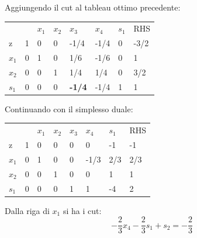 Aggiungendo il cut al tableau ottimo precedente:
\begin{table}[!h]
	\centering
	\begin{tabular}{llllllll}
				&                         & $x_{1}$ & $x_{2}$  & $x_{3}$ & $x_{4}$ & $s_{1}$ &  RHS  \\ \cline{2-8}
		z		& \multicolumn{1}{|l|}{1} & 0       & 0        & -1/4    & -1/4    & 0 & \multicolumn{1}{|l|}{-3/2} \\ \cline{2-8}
		$x_{1}$ & \multicolumn{1}{|l|}{0} & 1       & 0        & 1/6     & -1/6    & 0 & \multicolumn{1}{|l|}{1} \\
		$x_{2}$ & \multicolumn{1}{|l|}{0} & 0       & 1        & 1/4     & 1/4     & 0 & \multicolumn{1}{|l|}{3/2} \\
		$s_{1}$ & \multicolumn{1}{|l|}{0} & 0       & 0        & \textbf{-1/4}     & -1/4   & 1  & \multicolumn{1}{|l|}{1} \\ \cline{2-8}
	\end{tabular}
\end{table}

Continuando con il simplesso duale:
\begin{table}[!h]
	\centering
	\begin{tabular}{llllllll}
				&       				  & $x_{1}$ & $x_{2}$  & $x_{3}$ & $x_{4}$ & $s_{1}$ &  RHS  \\ \cline{2-8}
		z		& \multicolumn{1}{|l|}{1} & 0       & 0        & 0       & 0       & -1      & \multicolumn{1}{|l|}{-1} \\ \cline{2-8}
		$x_{1}$ & \multicolumn{1}{|l|}{0} & 1       & 0        & 0       & -1/3    & 2/3     & \multicolumn{1}{|l|}{2/3} \\
		$x_{2}$ & \multicolumn{1}{|l|}{0} & 0       & 1        & 0       & 0       & 1       & \multicolumn{1}{|l|}{1} \\
		$s_{1}$ & \multicolumn{1}{|l|}{0} & 0       & 0        & 1       & 1       & -4      & \multicolumn{1}{|l|}{2} \\ \cline{2-8}
	\end{tabular}
\end{table}

Dalla riga di $x_{1}$ si ha i cut:
\begin{equation}
-\frac{2}{3}x_{4} - \frac{2}{3}s_{1} + s_{2} = - \frac{2}{3}
\end{equation}

